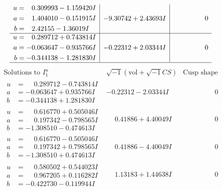 \documentclass[1p]{elsarticle_modified}
\theoremstyle{definition}
\newcommand{\I}{\sqrt{-1}}
\begin{document}
$$\begin{array}{c|c|c}
\begin{aligned}
u &= \phantom{-}0.309993 - 1.159420 I \\
a &= \phantom{-}1.404010 - 0.151915 I \\
b &= \phantom{-}2.42155 - 1.36019 I\end{aligned}
 & -9.30742 + 2.43693 I & \phantom{-0.000000 } 0 \\ \hline\begin{aligned}
u &= \phantom{-}0.289712 + 0.743814 I \\
a &= -0.063647 - 0.935766 I \\
b &= -0.344138 - 1.281830 I\end{aligned}
 & -0.22312 + 2.03344 I & \phantom{-0.000000 } 0\\
 \hline 
 \end{array}$$\newpage$$\begin{array}{c|c|c}  
\text{Solutions to }I^u_{1}& \I (\text{vol} + \sqrt{-1}CS) & \text{Cusp shape}\\
 \hline 
\begin{aligned}
u &= \phantom{-}0.289712 - 0.743814 I \\
a &= -0.063647 + 0.935766 I \\
b &= -0.344138 + 1.281830 I\end{aligned}
 & -0.22312 - 2.03344 I & \phantom{-0.000000 } 0 \\ \hline\begin{aligned}
u &= \phantom{-}0.616770 + 0.505046 I \\
a &= \phantom{-}0.197342 - 0.798565 I \\
b &= -1.308510 - 0.474613 I\end{aligned}
 & \phantom{-}0.41886 + 4.40049 I & \phantom{-0.000000 } 0 \\ \hline\begin{aligned}
u &= \phantom{-}0.616770 - 0.505046 I \\
a &= \phantom{-}0.197342 + 0.798565 I \\
b &= -1.308510 + 0.474613 I\end{aligned}
 & \phantom{-}0.41886 - 4.40049 I & \phantom{-0.000000 } 0 \\ \hline\begin{aligned}
u &= \phantom{-}0.580502 + 0.544023 I \\
a &= \phantom{-}0.967205 + 0.116282 I \\
b &= -0.422730 - 0.119944 I\end{aligned}
 & \phantom{-}1.13183 + 1.44638 I & \phantom{-0.000000 } 0 \\ \hline\begin{aligned}

\end{aligned}
\end{array}$$
\end{document}
